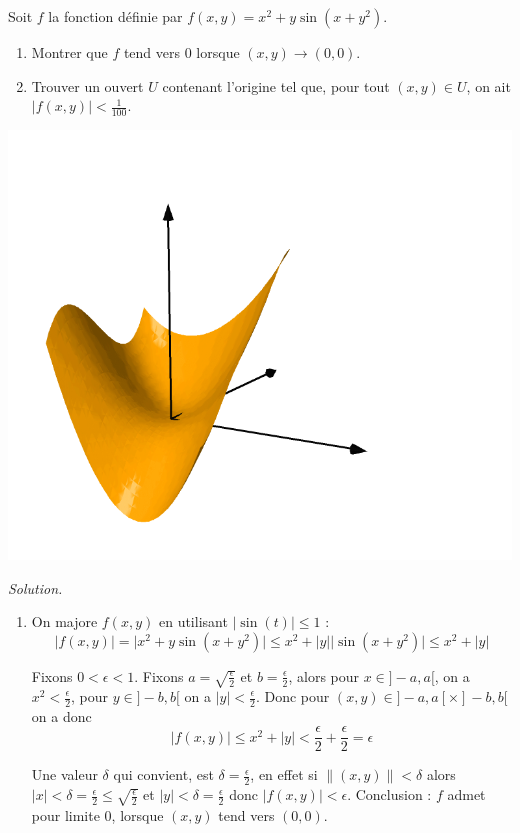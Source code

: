 \documentclass[12pt, class=report,crop=false]{standalone}
\begin{document}
\begin{exemple}
\label{ex:plusvarex}
Soit $f$ la fonction définie par $f(x,y) = x^2+y\sin(x+y^2)$.
\begin{enumerate}
  \item Montrer que $f$ tend vers $0$ lorsque $(x,y) \to (0,0)$. 
  \item Trouver un ouvert $U$ contenant l'origine tel que, pour tout $(x,y) \in U$, on ait $| f(x,y) | < \frac{1}{100}$.
\end{enumerate}
  
\begin{center}
  \includegraphics[scale=0.4]{figures/fig-plusvar-31-01}
\end{center}
 

\bigskip
\emph{Solution.}

\begin{enumerate}
  \item On majore $f(x,y)$ en utilisant $|\sin(t)| \le 1$ :
  $$\big| f(x,y) \big|  = \big| x^2+y\sin(x+y^2) \big| \le
  x^2 + |y| \big| \sin(x+y^2) \big| \le x^2 +|y|$$ 
  
  Fixons $0<\epsilon<1$. Fixons $a = \sqrt{\frac{\epsilon}{2}}$ et $b=\frac\epsilon2$,
  alors pour $x \in ]-a,a[$, on a $x^2 < \frac\epsilon2$, pour $y \in ]-b,b[$ on a $|y| < \frac\epsilon2$. Donc pour $(x,y) \in ]-a,a[ \times ]-b,b[$ on a donc 
  $$\big| f(x,y) \big| \le x^2 +|y| < \frac\epsilon2 + \frac\epsilon2 = \epsilon$$
  
  Une valeur $\delta$ qui convient, est $\delta = \frac\epsilon2$, en effet
  si $\| (x,y) \| < \delta$ alors $|x| < \delta = \frac\epsilon2 \le  \sqrt{\frac{\epsilon}{2}} $ 
  et $|y| < \delta = \frac\epsilon2$ donc $|f(x,y)| < \epsilon$. Conclusion : $f$ admet pour limite $0$, lorsque $(x,y)$ tend vers $(0,0)$.
  

\end{enumerate}
\end{exemple}
\end{document}
